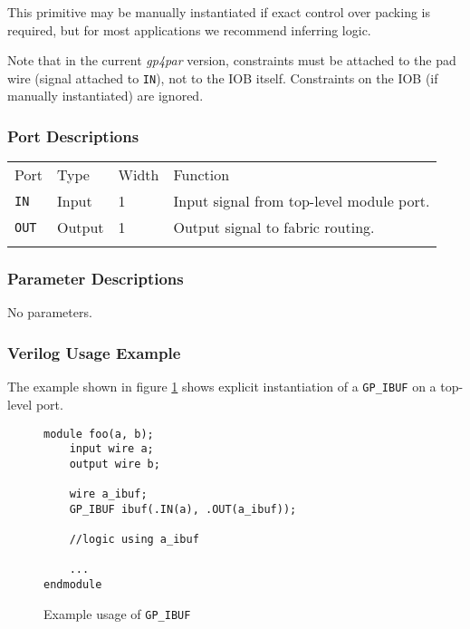 \documentclass[11pt]{article}
\newcommand{\namestyle}[1]{\textit{#1}}
\newcommand{\tokenstyle}[1]{\texttt{#1}}
\newcommand{\whenstyle}[1]{{\fontseries{sb}\selectfont#1}}
\newcommand{\thinhline}{\Xhline{1\arrayrulewidth}}
\newcommand{\thickhline}{\Xhline{2.5\arrayrulewidth}}
\begin{document}
This primitive may be manually instantiated if exact control over packing is required, but for most applications we
recommend inferring logic.

Note that in the current \namestyle{gp4par} version, constraints must be attached to the pad wire (signal attached to \tokenstyle{IN}), not
to the IOB itself. Constraints on the IOB (if manually instantiated) are ignored.

\subsubsection{Port Descriptions}

\begin{tabularx}{\textwidth}{lllX}
\thinhline
\whenstyle{Port} & \whenstyle{Type} & \whenstyle{Width} & \whenstyle{Function} \\
\thickhline
\tokenstyle{IN} & Input & 1 & Input signal from top-level module port. \\
\thinhline
\tokenstyle{OUT} & Output & 1 & Output signal to fabric routing. \\
\thinhline
\end{tabularx}

\subsubsection{Parameter Descriptions}

No parameters.

\subsubsection{Verilog Usage Example}

The example shown in figure \ref{gp-ibuf-example} shows explicit instantiation of a \tokenstyle{GP\_IBUF} on a top-level port.

\begin{figure}[h]
\begin{lstlisting}
module foo(a, b);
	input wire a;
	output wire b;

	wire a_ibuf;
	GP_IBUF ibuf(.IN(a), .OUT(a_ibuf));

	//logic using a_ibuf

	...
endmodule
\end{lstlisting}
\caption{Example usage of \tokenstyle{GP\_IBUF}}
\label{gp-ibuf-example}
\end{figure}

\end{document}
